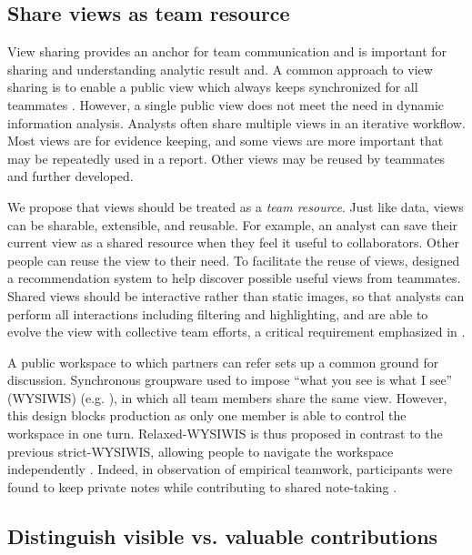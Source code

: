 \subsection{Share views as team resource}

View sharing provides an anchor for team communication and is important for sharing and understanding analytic result
\citep{Morton2014a} and. A common approach to view sharing is to enable a public view which always
keeps synchronized for all teammates \citep{Convertino2011,Greenberg1990}.
However, a single public view does not meet the need in dynamic information analysis.
Analysts often share multiple views in an iterative workflow. Most views are for evidence keeping, and some views are more important that may be repeatedly used in a report. Other views may be reused by teammates and further developed.

We propose that views should be treated as a \emph{team resource}. Just
like data, views can be sharable, extensible, and reusable. For example, an analyst
can save their current view as a shared resource when they feel it useful to
collaborators. Other people can reuse the view to their need. To facilitate the reuse of views, \cite{Nobarany2012} designed a recommendation system to help discover possible useful views from teammates. Shared views
should be interactive rather than static images, so that analysts can perform
all interactions including filtering and highlighting, and are able to evolve
the view with collective team efforts, a critical requirement emphasized in
\cite{Carroll2013}.

A public workspace to
which partners can refer sets up a common ground for discussion. Synchronous
groupware used to impose “what you see is what I see” (WYSIWIS) (e.g. \cite{stefik1987wysiwis}),  in which all team members share the same view. However, this design
blocks production as only one member is able to control the workspace in one
turn. Relaxed-WYSIWIS is thus proposed in contrast to the previous
strict-WYSIWIS, allowing people to navigate the workspace independently \citep{Gutwin1998h}. 
Indeed, in observation of empirical teamwork, participants
were found to keep private notes while contributing to shared note-taking \citep{Borge2012}.

\subsection{Distinguish visible vs. valuable contributions}

